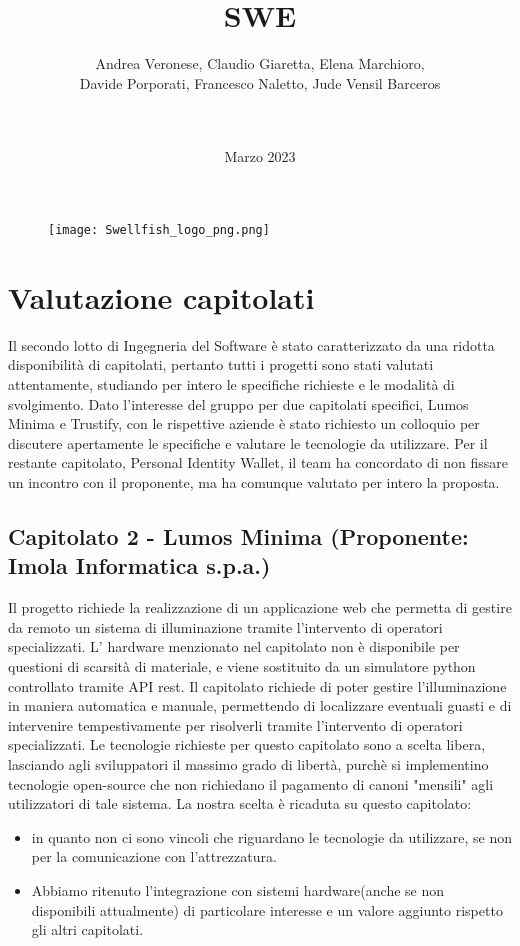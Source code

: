\documentclass[12pt]{article}
\title{SWE}
\begin{document}
\begin{figure}
\centering
\texttt{[image: Swellfish\_logo\_png.png]}
\end{figure}
\author{Andrea Veronese, Claudio Giaretta, Elena Marchioro,\\
Davide Porporati, Francesco Naletto, Jude Vensil Barceros \\ \\
 \href{swellfish14@gmail.com}{} \\
} 
\date{Marzo 2023}



\maketitle

\section{Valutazione capitolati}
Il secondo lotto di Ingegneria del Software è stato caratterizzato da una ridotta disponibilità di capitolati, pertanto tutti i progetti sono stati valutati attentamente, studiando per intero le specifiche richieste e le modalità di svolgimento.
Dato l'interesse del gruppo per due capitolati specifici, Lumos Minima e Trustify, con le rispettive aziende è stato richiesto un colloquio per discutere apertamente le specifiche e valutare le tecnologie da utilizzare.
Per il restante capitolato, Personal Identity Wallet, il team ha concordato di non fissare un incontro con il proponente, ma ha comunque valutato per intero la proposta.
\subsection{Capitolato 2 - Lumos Minima (Proponente: Imola Informatica s.p.a.)}
    Il progetto richiede la realizzazione di un applicazione web che permetta di gestire da remoto un sistema di illuminazione tramite l'intervento di operatori specializzati. L' hardware menzionato nel capitolato non è disponibile per questioni di scarsità di materiale, e viene sostituito da un simulatore python controllato tramite API rest.
    Il capitolato richiede di poter gestire l'illuminazione in maniera automatica e manuale, permettendo di localizzare eventuali guasti e di intervenire tempestivamente per risolverli tramite l'intervento di operatori specializzati.
    Le tecnologie richieste per questo capitolato sono a scelta libera, lasciando agli sviluppatori il massimo grado di libertà, purchè si implementino tecnologie open-source che non richiedano il pagamento di canoni "mensili" agli utilizzatori di tale sistema.
    La nostra scelta è ricaduta su questo capitolato:
    \begin{itemize}
        \item in quanto non ci sono vincoli che riguardano le tecnologie da utilizzare, se non per la comunicazione con l'attrezzatura.
        \item Abbiamo ritenuto l'integrazione con sistemi hardware(anche se non disponibili attualmente) di particolare interesse e un valore aggiunto rispetto gli altri capitolati.
    \end{itemize}
    
\end{document}
